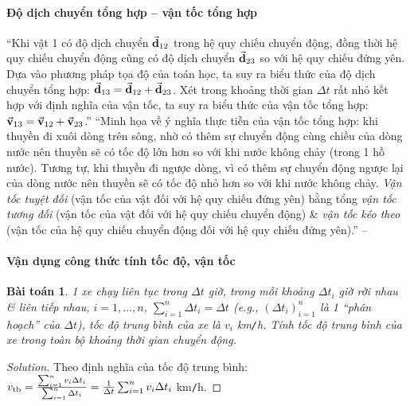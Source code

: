 \documentclass{article}
\numberwithin{equation}{section}
\newtheorem{baitoan}{Bài toán}[section]
\begin{document}
\paragraph{Độ dịch chuyển tổng hợp -- vận tốc tổng hợp}
``Khi vật 1 có độ dịch chuyển $\vec{\bf d}_{12}$ trong hệ quy chiếu chuyển động, đồng thời hệ quy chiếu chuyển động cũng có độ dịch chuyển $\vec{\bf d}_{23}$ so với hệ quy chiếu đứng yên. Dựa vào phương pháp tọa độ của toán học, ta suy ra biểu thức của độ dịch chuyển tổng hợp: $\vec{\bf d}_{13} = \vec{\bf d}_{12} + \vec{\bf d}_{23}$. Xét trong khoảng thời gian $\Delta t$ rất nhỏ kết hợp với định nghĩa của vận tốc, ta suy ra biểu thức của vận tốc tổng hợp: $\vec{\bf v}_{13} = \vec{\bf v}_{12} + \vec{\bf v}_{23}$.'' ``Minh họa về ý nghĩa thực tiễn của vận tốc tổng hợp: khi thuyền đi xuôi dòng trên sông, nhờ có thêm sự chuyển động cùng chiều của dòng nước nên thuyền sẽ có tốc độ lớn hơn so với khi nước không chảy (trong 1 hồ nước). Tương tự, khi thuyền đi ngược dòng, vì có thêm sự chuyển động ngược lại của dòng nước nên thuyền sẽ có tốc độ nhỏ hơn so với khi nước không chảy. \textit{Vận tốc tuyệt đối} (vận tốc của vật đối với hệ quy chiếu đứng yên) bằng tổng \textit{vận tốc tương đối} (vận tốc của vật đối với hệ quy chiếu chuyển động) \& \textit{vận tốc kéo theo} (vận tốc của hệ quy chiếu chuyển động đối với hệ quy chiếu đứng yên).'' -- \cite[p. 33]{SGK_Vat_Ly_10_Chan_Troi_Sang_Tao}

\paragraph{Vận dụng công thức tính tốc độ, vận tốc}

\begin{baitoan}
	1 xe chạy liên tục trong $\Delta t$ giờ, trong mỗi khoảng $\Delta t_i$ giờ rời nhau \& liên tiếp nhau, $i = 1,\ldots,n$, $\sum_{i=1}^n \Delta t_i = \Delta t$ (e.g., $(\Delta t_i)_{i=1}^n$ là 1 ``phân hoạch'' của $\Delta t$), tốc độ trung bình của xe là $v_i$ km\emph{\texttt{/}}h. Tính tốc độ trung bình của xe trong toàn bộ khoảng thời gian chuyển động.
\end{baitoan}

\begin{proof}[Solution]
	Theo định nghĩa của tốc độ trung bình: $v_{\rm tb} = \frac{\sum_{i=1}^n v_i\Delta t_i}{\sum_{i=1}^n \Delta t_i} = \frac{1}{\Delta t}\sum_{i=1}^n v_i\Delta t_i$ km\texttt{/}h.
\end{proof}

\end{document}
